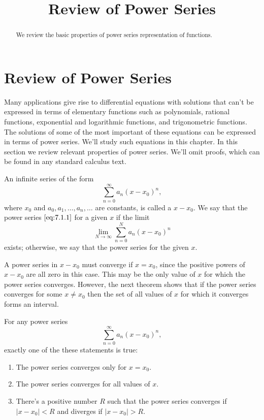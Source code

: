 \documentclass{ximera}
\title{Review of Power Series}%
\begin{document}
\begin{abstract}
We review the basic properties of power series representation of functions.
\end{abstract}

\maketitle

\section*{Review of Power Series}

Many applications give rise to differential equations with solutions
that can't be expressed in terms of elementary functions such as
polynomials, rational functions, exponential and logarithmic
functions, and trigonometric functions. The solutions of some of the
most important of these equations can be expressed in terms of power
series. We'll study such equations in this chapter. In this section
we review relevant properties of power series. We'll omit proofs,
which can be found in any standard calculus text.

\begin{definition}\label{thmtype:7.1.1}
An infinite series of the form
\begin{equation} \label{eq:7.1.1}
\sum_{n=0}^\infty a_n(x-x_0)^n,
\end{equation}
where $x_0$ and $a_0, a_1, \dots, a_n, \dots$ are constants, is
called a
 $x-x_0$. We say that the power series
$\eqref{eq:7.1.1}$  for a given $x$ if the limit
$$
\lim_{N\rightarrow\infty}
\sum_{n=0}^Na_n(x-x_0)^n
$$
exists; otherwise, we say that the power series   for
the given $x$.
\end{definition}

A power series in $x-x_0$ must converge if $x=x_0$, since the positive
powers of $x-x_0$ are all zero in this case. This may be the only
value of $x$ for which the power series converges. However, the
next theorem shows that if the power series converges for some
$x\neq
x_0$ then the set of all values of $x$ for which it converges forms an interval.

\begin{theorem}\label{thmtype:7.1.2}
For any power series
$$
\sum_{n=0}^\infty a_n(x-x_0)^n,
$$
exactly one of the these statements is true$:$
\begin{enumerate}
\item\label{item:7.1.2a} %
The power series converges  only for $x=x_0.$
\item\label{item:7.1.2b} %
The power series converges for all values of $x.$
\item\label{item:7.1.2c} %
There's a positive number $R$ such that  the power series
converges if $|x-x_0|<R$ and diverges if  $|x-x_0|>R$.
\end{enumerate}
\end{theorem}
\end{document}

